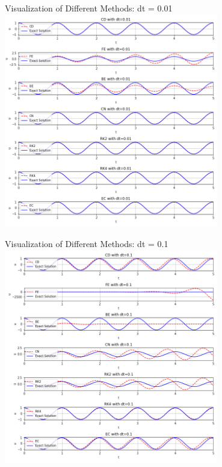 \documentclass[10pt, aspectratio=54]{beamer}
\begin{document}
\begin{frame}{Visualization of Different Methods: dt = 0.01}
	\centering
	\includegraphics[width=0.7\textwidth]{Figures/Each_Method_Comparison_dt_0.01.png} %
\end{frame}
\begin{frame}{Visualization of Different Methods: dt = 0.1}
	\centering
	\includegraphics[width=0.7\textwidth]{Figures/Each_Method_Comparison_dt_0.1.png} %
\end{frame}
\end{document}
